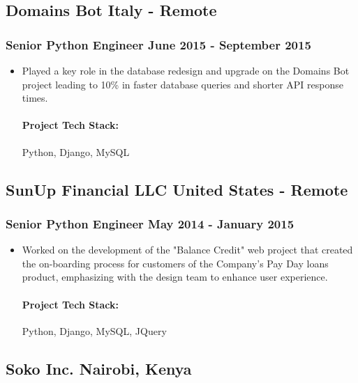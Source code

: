 \documentclass[11pt]{article} %
\begin{document}
\subsection{Domains Bot \hfill Italy - Remote}
\subsubsection{Senior Python Engineer \hfill  June 2015 - September 2015}
\begin{itemize}
    \item Played a key role in the database redesign and upgrade on the Domains Bot project leading to 10\% in faster database queries and shorter API response times.

    \paragraph{Project Tech Stack:} Python, Django, MySQL
\end{itemize}

\subsection{SunUp Financial LLC \hfill United States - Remote}
\subsubsection{Senior Python Engineer \hfill  May 2014 - January 2015}
\begin{itemize}
    \item Worked on the development of the "Balance Credit" web project that created the on-boarding process for customers of the Company's Pay Day loans product, emphasizing with the design team to enhance user experience.

    \paragraph{Project Tech Stack:} Python, Django, MySQL, JQuery
\end{itemize}

\subsection{Soko Inc. \hfill Nairobi, Kenya}
\end{document}
